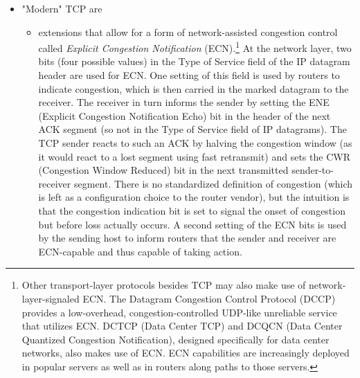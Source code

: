 \documentclass[table, xcdraw]{article}%
\begin{document}
\begin{itemize}
    TCP Cubic, introduced in 2008, offers a better way of probing for a packet sending rate that is just below the threshold of triggering packet loss. It only changes the congestion avoidance mode and the congestion window is still increased only on ACK receipt. The increase is determined by a function that takes as input the time remaining until \texttt{cwnd} matches the previous congestion threshold; the value of \texttt{cwnd} at which the previous packet loss was triggered (assuming no losses until that time). The function quickly ramps up TCP’s sending rate to get close to this congestion threshold rate, and only then decreases the increase as it approaches it. In other words, rather than increasing linearly, it increases logarithmically until the time of (expected) congestion. If the congestion threshold has disappeared and TCP is past that point in time, it increases exponentially, i.e. it is still cautious right after, but increases faster after that. See Figure 3.54 in Chapter 3.7. In 2014, nearly 50\% of the 5000 most popular Web servers shows that were running TCP Cubic.
    \item "Modern" TCP are
    \begin{itemize}
        \item extensions that allow for a form of network-assisted congestion control called \emph{Explicit Congestion Notification} (ECN).\footnote{Other transport-layer protocols besides TCP may also make use of network-layer-signaled ECN. The Datagram Congestion Control Protocol (DCCP) provides a low-overhead, congestion-controlled UDP-like unreliable service that utilizes ECN. DCTCP (Data Center TCP) and DCQCN (Data Center Quantized Congestion Notification), designed specifically for data center networks, also makes use of ECN. ECN capabilities are increasingly deployed in popular servers as well as in routers along paths to those servers.} At the network layer, two bits (four possible values) in the Type of Service field of the IP datagram header are used for ECN. One setting of this field is used by routers to indicate congestion, which is then carried in the marked datagram to the receiver. The receiver in turn informs the sender by setting the ENE (Explicit Congestion Notification Echo) bit in the header of the next ACK segment (so not in the Type of Service field of IP datagrams). The TCP sender reacts to such an ACK by halving the congestion window (as it would react to a lost segment using fast retransmit) and sets the CWR (Congestion Window Reduced) bit in the next transmitted sender-to-receiver segment. There is no standardized definition of congestion (which is left as a configuration choice to the router vendor), but the intuition is that the congestion indication bit is set to signal the onset of congestion but before loss actually occurs. A second setting of the ECN bits is used by the sending host to inform routers that the sender and receiver are ECN-capable and thus capable of taking action.

\end{itemize}
\end{itemize}
\end{document}
